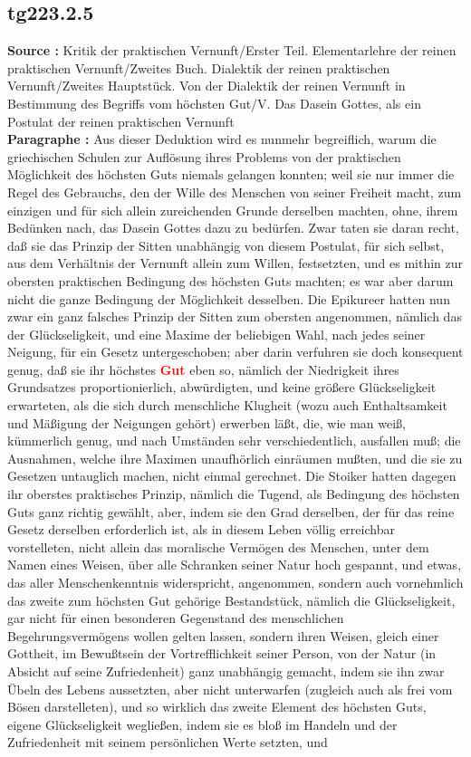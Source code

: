 \documentclass[a4paper,12pt,twoside]{book}
\newcommand{\match}[1]{\textcolor{red}{\textbf{#1}}}
\begin{document}
	\subsection*{tg223.2.5} 
	\textbf{Source : }Kritik der praktischen Vernunft/Erster Teil. Elementarlehre der reinen praktischen Vernunft/Zweites Buch. Dialektik der reinen praktischen Vernunft/Zweites Hauptstück. Von der Dialektik der reinen Vernunft in Bestimmung des Begriffs vom höchsten Gut/V. Das Dasein Gottes, als ein Postulat der reinen praktischen Vernunft\\  
	
	\textbf{Paragraphe : }Aus dieser Deduktion wird es nunmehr begreiflich, warum die griechischen Schulen zur Auflösung ihres Problems von der praktischen Möglichkeit des höchsten Guts niemals gelangen konnten; weil sie nur immer die Regel des Gebrauchs, den der Wille des Menschen von seiner Freiheit macht, zum einzigen und für sich allein zureichenden Grunde derselben machten, ohne, ihrem Bedünken nach, das Dasein Gottes dazu zu bedürfen. Zwar taten sie daran recht, daß sie das Prinzip der Sitten unabhängig von diesem Postulat, für sich selbst, aus dem Verhältnis der Vernunft allein zum Willen, festsetzten, und es mithin zur obersten praktischen Bedingung des höchsten Guts machten; es war aber darum nicht die ganze Bedingung der Möglichkeit desselben. Die Epikureer hatten nun zwar ein ganz falsches Prinzip der Sitten zum obersten angenommen, nämlich das der Glückseligkeit, und eine Maxime der beliebigen Wahl, nach jedes seiner Neigung, für ein Gesetz untergeschoben; aber darin verfuhren sie doch konsequent genug, daß sie ihr höchstes \match{Gut} eben so, nämlich der Niedrigkeit ihres Grundsatzes proportionierlich, abwürdigten, und keine größere Glückseligkeit erwarteten, als die sich durch menschliche Klugheit (wozu auch Enthaltsamkeit und Mäßigung der Neigungen gehört) erwerben läßt, die, wie man weiß, kümmerlich genug, und nach Umständen sehr verschiedentlich, ausfallen muß; die Ausnahmen, welche ihre  Maximen unaufhörlich einräumen mußten, und die sie zu Gesetzen untauglich machen, nicht einmal gerechnet. Die Stoiker hatten dagegen ihr oberstes praktisches Prinzip, nämlich die Tugend, als Bedingung des höchsten Guts ganz richtig gewählt, aber, indem sie den Grad derselben, der für das reine Gesetz derselben erforderlich ist, als in diesem Leben völlig erreichbar vorstelleten, nicht allein das moralische Vermögen des Menschen, unter dem Namen eines Weisen, über alle Schranken seiner Natur hoch gespannt, und etwas, das aller Menschenkenntnis widerspricht, angenommen, sondern auch vornehmlich das zweite zum höchsten Gut gehörige Bestandstück, nämlich die Glückseligkeit, gar nicht für einen besonderen Gegenstand des menschlichen Begehrungsvermögens wollen gelten lassen, sondern ihren Weisen, gleich einer Gottheit, im Bewußtsein der Vortrefflichkeit seiner Person, von der Natur (in Absicht auf seine Zufriedenheit) ganz unabhängig gemacht, indem sie ihn zwar Übeln des Lebens aussetzten, aber nicht unterwarfen (zugleich auch als frei vom Bösen darstelleten), und so wirklich das zweite Element des höchsten Guts, eigene Glückseligkeit wegließen, indem sie es bloß im Handeln und der Zufriedenheit mit seinem persönlichen Werte setzten, und 
\end{document}
